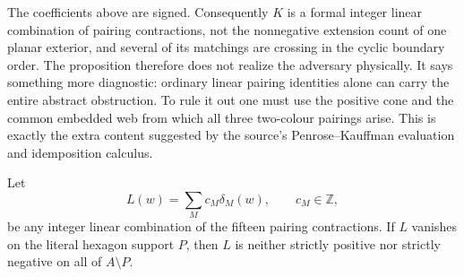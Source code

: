 The coefficients above are signed.  Consequently \(K\) is a formal integer
linear combination of pairing contractions, not the nonnegative extension
count of one planar exterior, and several of its matchings are crossing in
the cyclic boundary order.  The proposition therefore does not realize the
adversary physically.  It says something more diagnostic: ordinary linear
pairing identities alone can carry the entire abstract obstruction.  To
rule it out one must use the positive cone and the common embedded web from
which all three two-colour pairings arise.  This is exactly the extra content
suggested by the source's Penrose--Kauffman evaluation and idemposition
calculus.

\begin{proposition}
\label{prop:hexagon-no-linear-pairing-separator}
Let
\[
                   L(w)=\sum_{M}c_M\delta_M(w),\qquad c_M\in\mathbb Z,
\]
be any integer linear combination of the fifteen pairing contractions.  If
\(L\) vanishes on the literal hexagon support \(P\), then \(L\) is neither
strictly positive nor strictly negative on all of \(A\setminus P\).
\end{proposition}

